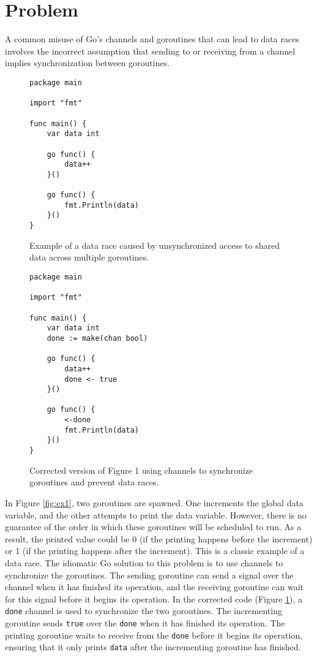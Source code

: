 \documentclass[12pt]{article}
\begin{document}
\section{Problem}

A common misuse of Go's channels and goroutines that can lead to data races involves the incorrect assumption that sending to or receiving from a channel implies synchronization between goroutines.

\begin{figure}[!ht]
\begin{minipage}[c]{0.45\linewidth}
\begin{verbatim}
package main

import "fmt"

func main() {
	var data int

	go func() {
		data++
	}()

	go func() {
		fmt.Println(data)
	}()
}
\end{verbatim}
\caption{Example of a data race caused by unsynchronized access to shared data across multiple goroutines.}
\label{fig:ex1}
\end{minipage}
\hfill
\begin{minipage}[c]{0.45\linewidth}
\begin{verbatim}
package main

import "fmt"

func main() {
	var data int
	done := make(chan bool)

	go func() {
		data++
		done <- true
	}()

	go func() {
		<-done
		fmt.Println(data)
	}()
}
\end{verbatim}
\caption{Corrected version of Figure 1 using channels to synchronize goroutines and prevent data races.}
\label{fig:ex2}
\end{minipage}
\end{figure}

In Figure \ref{fig:ex1}, two goroutines are spawned. One increments the global data variable, and the other attempts to print the data variable. However, there is no guarantee of the order in which these goroutines will be scheduled to run. As a result, the printed value could be 0 (if the printing happens before the increment) or 1 (if the printing happens after the increment). This is a classic example of a data race. The idiomatic Go solution to this problem is to use channels to synchronize the goroutines. The sending goroutine can send a signal over the channel when it has finished its operation, and the receiving goroutine can wait for this signal before it begins its operation. In the corrected code (Figure \ref{fig:ex2}), a \texttt{done} channel is used to synchronize the two goroutines. The incrementing goroutine sends \texttt{true} over the \texttt{done} when it has finished its operation. The printing goroutine waits to receive from the \texttt{done} before it begins its operation, ensuring that it only prints \texttt{data} after the incrementing goroutine has finished.
\end{document}
